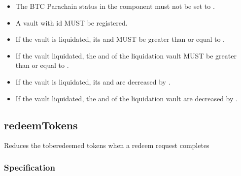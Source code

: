 \documentclass[a4paper,10pt,english]{sphinxmanual}
\begin{document}
\begin{itemize}
\item {} 
The BTC Parachain status in the {\hyperref[\detokenize{spec/security:security}]{}} component must not be set to .

\item {} 
A vault with id  MUST be registered.

\item {} 
If the vault is  liquidated, its  and  MUST be greater than or equal to .

\item {} 
If the vault  liquidated, the  and  of the liquidation vault MUST be greater than or equal to .

\end{itemize}

\begin{itemize}
\item {} 
If the vault is  liquidated, its  and  are decreased by .

\item {} 
If the vault  liquidated, the  and  of the liquidation vault are decreased by .

\end{itemize}


\subsection{redeemTokens}
\label{\detokenize{spec/vault-registry:redeemtokens}}\label{\detokenize{spec/vault-registry:id25}}
Reduces the to\sphinxhyphen{}be\sphinxhyphen{}redeemed tokens when a redeem request completes


\subsubsection{Specification}
\label{\detokenize{spec/vault-registry:id26}}
\end{document}
